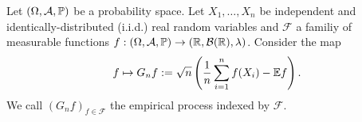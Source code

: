 
Let 
$
  \left( 
    \Omega,
    \mathcal{A},
    \P
  \right)
$
be a probability space.
Let 
$X_1, \ldots, X_n$ be independent and identically-distributed (i.i.d.)
real random variables
and $\mathcal{F}$ a familiy of measurable functions
$
  f:
  \left( 
    \Omega,
    \mathcal{A},
    \P
  \right)
    \to
  \left( 
    \R,
    \mathcal{B}(\R),
    \lambda
  \right)
$.
Consider the map
\begin{gather}
  f
  \mapsto
  G_n f
  :=
  \sqrt{n}
  \left( 
    \frac{1}{n}
    \sum_{i = 1}^{n}
      f(X_i)
    -
    \E f
  \right).
\end{gather}
We call 
$
  \left( 
    G_n f
  \right)_{f \in \mathcal{F}}
$
the empirical process indexed by $\mathcal{F}$.
